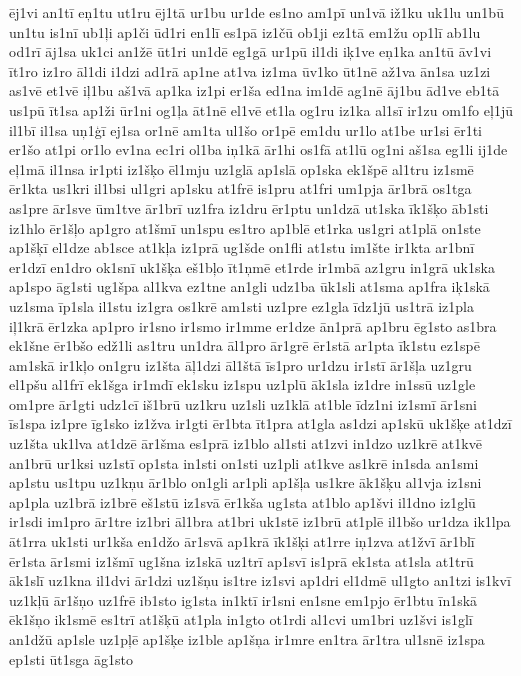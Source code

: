 {ēj1vi
an1tī
eņ1tu
ut1ru
ēj1tā
ur1bu
ur1de
es1no
am1pī
un1vā
iž1ku
uk1lu
un1bū
un1tu
is1nī
ub1ļi
ap1či
ūd1ri
en1lī
es1pā
iz1čū
ob1ji
ez1tā
em1žu
op1lī
ab1lu
od1rī
āj1sa
uk1ci
an1žē
ūt1ri
un1dē
eg1gā
ur1pū
il1di
iķ1ve
eņ1ka
an1tū
āv1vi
īt1ro
iz1ro
āl1di
i1dzi
ad1rā
ap1ne
at1va
iz1ma
ūv1ko
ūt1nē
až1va
ān1sa
uz1zi
as1vē
et1vē
iļ1bu
aš1vā
ap1ka
iz1pi
er1ša
ed1na
im1dē
ag1nē
āj1bu
ād1ve
eb1tā
us1pū
īt1sa
ap1ži
ūr1ni
og1ļa
āt1nē
el1vē
et1la
og1ru
iz1ka
al1sī
ir1zu
om1fo
eļ1jū
il1bī
il1sa
uņ1ģī
ej1sa
or1nē
am1ta
ul1šo
or1pē
em1du
ur1lo
at1be
ur1si
ēr1ti
er1šo
at1pi
or1lo
ev1na
ec1ri
ol1ba
iņ1kā
ār1hi
os1fā
at1lū
og1ni
aš1sa
eg1li
ij1de
eļ1mā
il1nsa
ir1pti
iz1šķo
ēl1mju
uz1glā
ap1slā
op1ska
ek1špē
al1tru
iz1smē
ēr1kta
us1kri
il1bsi
ul1gri
ap1sku
at1frē
is1pru
at1fri
um1pja
ār1brā
os1tga
as1pre
ār1sve
ūm1tve
ār1brī
uz1fra
iz1dru
ēr1ptu
un1dzā
ut1ska
īk1šķo
āb1sti
iz1hlo
ēr1šļo
ap1gro
at1šmī
un1spu
es1tro
ap1blē
et1rka
us1gri
at1plā
on1ste
ap1šķī
el1dze
ab1sce
at1kļa
iz1prā
ug1šde
on1fli
at1stu
im1šte
ir1kta
ar1bnī
er1dzī
en1dro
ok1snī
uk1šķa
eš1bļo
īt1ņmē
et1rde
ir1mbā
az1gru
in1grā
uk1ska
ap1spo
āg1sti
ug1špa
al1kva
ez1tne
an1gli
udz1ba
ūk1sli
at1sma
ap1fra
iķ1skā
uz1sma
īp1sla
il1stu
iz1gra
os1krē
am1sti
uz1pre
ez1gla
īdz1jū
us1trā
iz1pla
iļ1krā
ēr1zka
ap1pro
ir1sno
ir1smo
ir1mme
er1dze
ān1prā
ap1bru
ēg1sto
as1bra
ek1šne
ēr1bšo
edž1li
as1tru
un1dra
āl1pro
ār1grē
ēr1stā
ar1pta
īk1stu
ez1spē
am1skā
ir1kļo
on1gru
iz1šta
āļ1dzi
āl1štā
īs1pro
ur1dzu
ir1stī
ār1šļa
uz1gru
el1pšu
al1frī
ek1šga
ir1mdī
ek1sku
iz1spu
uz1plū
āk1sla
iz1dre
in1ssū
uz1gle
om1pre
ār1gti
udz1cī
iš1brū
uz1kru
uz1sli
uz1klā
at1ble
īdz1ni
iz1smī
ār1sni
īs1spa
iz1pre
īg1sko
iz1žva
ir1gti
ēr1bta
īt1pra
at1gla
as1dzi
ap1skū
uk1šķe
at1dzī
uz1šta
uk1lva
at1dzē
ār1šma
es1prā
iz1blo
al1sti
at1zvi
in1dzo
uz1krē
at1kvē
an1brū
ur1ksi
uz1stī
op1sta
in1sti
on1sti
uz1pli
at1kve
as1krē
in1sda
an1smi
ap1stu
us1tpu
uz1kņu
ār1blo
on1gli
ar1pli
ap1šļa
us1kre
āk1šķu
al1vja
iz1sni
ap1pla
uz1brā
iz1brē
eš1stū
iz1svā
ēr1kša
ug1sta
at1blo
ap1švi
il1dno
iz1glū
ir1sdi
im1pro
ār1tre
iz1bri
āl1bra
at1bri
uk1stē
iz1brū
at1plē
il1bšo
ur1dza
ik1lpa
āt1rra
uk1sti
ur1kša
en1džo
ār1svā
ap1krā
īk1šķi
at1rre
iņ1zva
at1žvī
ār1blī
ēr1sta
ār1smi
iz1šmī
ug1šna
iz1skā
uz1trī
ap1svī
is1prā
ek1sta
at1sla
at1trū
āk1slī
uz1kna
il1dvi
ār1dzi
uz1šņu
is1tre
iz1svi
ap1dri
el1dmē
ul1gto
an1tzi
is1kvī
uz1kļū
ār1šņo
uz1frē
ib1sto
ig1sta
in1ktī
ir1sni
en1sne
em1pjo
ēr1btu
īn1skā
ēk1šņo
ik1smē
es1trī
at1šķū
at1pla
in1gto
ot1rdi
al1cvi
um1bri
uz1švi
is1glī
an1džū
ap1sle
uz1pļē
ap1šķe
iz1ble
ap1šņa
ir1mre
en1tra
ār1tra
ul1snē
iz1spa
ep1sti
ūt1sga
āg1sto
}
